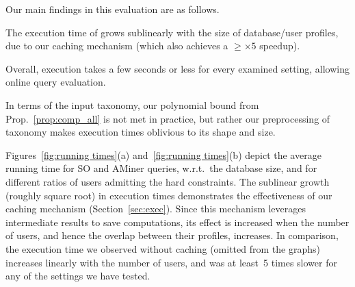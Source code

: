Our main findings in this evaluation are as follows.
\begin{compactitem}
\item The execution time of \qlang{} grows sublinearly with the size of database/user profiles, due to our caching mechanism (which also achieves a $\geq\times5$ speedup).
\item Overall, execution takes a few seconds or less for every examined setting, allowing online query evaluation.
\item In terms of the input taxonomy, our polynomial bound from Prop.~\ref{prop:comp_all} is not met in practice, but rather our preprocessing of taxonomy makes execution times oblivious to its shape and size.
\end{compactitem}
Figures~\ref{fig:running times}(a) and~\ref{fig:running times}(b) depict the average running time for SO and AMiner queries, w.r.t.\ the database size, and for different ratios of users admitting the hard constraints.  
The sublinear growth (roughly square root) in execution times demonstrates the effectiveness of our caching mechanism (Section~\ref{sec:exec}). Since this mechanism leverages intermediate results to save computations, its effect is increased when the number of users, and hence the overlap between their profiles, increases. In comparison, the execution time we observed without caching (omitted from the graphs) increases linearly with the number of users, and was at least~5 times slower for any of the settings we have tested.




